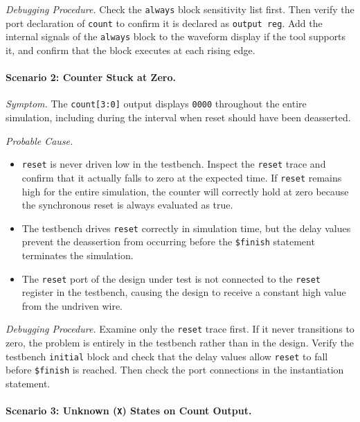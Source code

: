 \textit{Debugging Procedure.} Check the \texttt{always} block sensitivity
list first. Then verify the port declaration of \texttt{count} to confirm
it is declared as \texttt{output reg}. Add the internal signals of the
\texttt{always} block to the waveform display if the tool supports it, and
confirm that the block executes at each rising edge.

\paragraph{Scenario 2: Counter Stuck at Zero.}

\textit{Symptom.} The \texttt{count[3:0]} output displays \texttt{0000}
throughout the entire simulation, including during the interval when reset
should have been deasserted.

\textit{Probable Cause.}
\begin{itemize}
    \item \texttt{reset} is never driven low in the testbench. Inspect the
          \texttt{reset} trace and confirm that it actually falls to zero at
          the expected time. If \texttt{reset} remains high for the entire
          simulation, the counter will correctly hold at zero because the
          synchronous reset is always evaluated as true.
    \item The testbench drives \texttt{reset} correctly in simulation time,
          but the delay values prevent the deassertion from occurring before
          the \texttt{\$finish} statement terminates the simulation.
    \item The \texttt{reset} port of the design under test is not connected
          to the \texttt{reset} register in the testbench, causing the design
          to receive a constant high value from the undriven wire.
\end{itemize}

\textit{Debugging Procedure.} Examine only the \texttt{reset} trace first.
If it never transitions to zero, the problem is entirely in the testbench
rather than in the design. Verify the testbench \texttt{initial} block and
check that the delay values allow \texttt{reset} to fall before
\texttt{\$finish} is reached. Then check the port connections in the
instantiation statement.

\paragraph{Scenario 3: Unknown (\texttt{X}) States on Count Output.}

